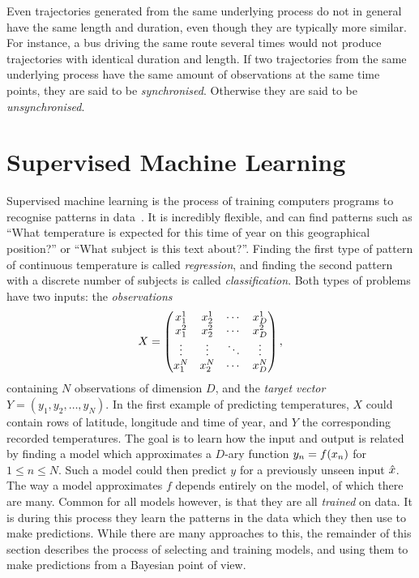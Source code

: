 Even trajectories generated from the same underlying process do not in general
have the same length and duration, even though they are typically more
similar. For instance, a bus driving the same route several times
would not produce trajectories with identical duration and length. 
If two trajectories from the same underlying
process have the same amount of observations at the same time points,
they are said to be \textit{synchronised}. 
Otherwise they are said to be \textit{unsynchronised}.

\section{Supervised Machine Learning}
Supervised machine learning is the process of training computers programs to
recognise patterns in data~\cite{Bishop-2006}. It is incredibly
flexible, and can find patterns such as ``What
temperature is expected for this time of year on this geographical
position?'' or ``What subject is this text about?''. Finding the first
type of pattern of continuous temperature is called
\textit{regression}, and finding the
second pattern with a discrete number of subjects is called
\textit{classification}. Both types of problems have two inputs: 
the \textit{observations}
\[X =
  \begin{pmatrix}
    x_{1}^{1} & x_{2}^{1} & \cdots & x_{D}^{1} \\
    x_{1}^{2} & x_{2}^{2} & \cdots & x_{D}^{2} \\
    \vdots  & \vdots  & \ddots & \vdots  \\
    x_{1}^{N} & x_{2}^{N} & \cdots & x_{D}^{N} \\
  \end{pmatrix},
\]
containing $N$ observations of dimension $D$, and the \textit{target vector} $Y = (y_{1},
y_{2}, \dots, y_{N})$. In the first example of predicting temperatures,
$X$ could contain rows of latitude, longitude and time of year, and $Y$ the
corresponding recorded temperatures. The
goal is to learn how the input and output is related by finding a model which approximates a $D$-ary function $y_n =
f(x_n)$ for $1 \leq n \leq N$. Such a model could then
predict $y$ for a previously unseen input $\hat{x}$. The way a
model approximates $f$ depends entirely on the model, of which there
are many. Common for all models however, is that they are all \textit{trained}
on data. It is during this process they learn the patterns in the data
which they then use to make predictions.
While there are many approaches to this, the remainder of this
section describes the process of selecting and training models,
and using them to make predictions from a Bayesian point of view.

